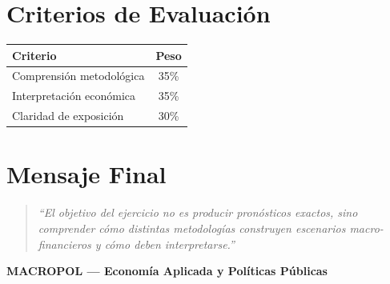 \documentclass[12pt]{article}
\begin{document}
\vspace{0.5cm}


\section*{Criterios de Evaluación}

\begin{table}[H]
\centering

\begin{tabular}{lc}

\toprule

\textbf{Criterio} & \textbf{Peso} \\

\midrule

Comprensión metodológica & 35\% \\

Interpretación económica & 35\% \\

Claridad de exposición & 30\% \\

\bottomrule

\end{tabular}

\end{table}

\vspace{1cm}


\section*{Mensaje Final}

\begin{quote}
\itshape
“El objetivo del ejercicio no es producir pronósticos exactos, 
sino comprender cómo distintas metodologías construyen 
escenarios macro-financieros y cómo deben interpretarse.”
\end{quote}

\vfill

\begin{center}
\textbf{MACROPOL — Economía Aplicada y Políticas Públicas}
\end{center}

\end{document}
